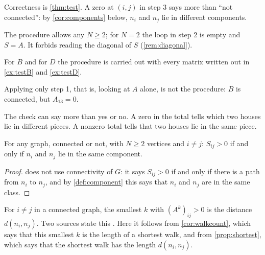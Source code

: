Correctness is \cref{thm:test}.
A zero at $(i,j)$ in step 3 says more than ``not connected'': by \cref{cor:components} below, $n_i$ and $n_j$ lie in different components.

\begin{remark}
The procedure allows any $N\ge 2$; for $N=2$ the loop in step 2 is empty and $S=A$.
It forbids reading the diagonal of $S$ (\cref{rem:diagonal}).
\end{remark}

\begin{example}
For $B$ and for $D$ the procedure is carried out with every matrix written out in \cref{ex:testB} and \cref{ex:testD}.
\end{example}

\begin{nonexample}
Applying only step 1, that is, looking at $A$ alone, is not the procedure: $B$ is connected, but $A_{13}=0$.
\end{nonexample}

\plainwords The check can say more than yes or no.
A zero in the total tells which two houses lie in different pieces.
A nonzero total tells that two houses lie in the same piece.

\begin{corollary}\label{cor:components}
For any graph, connected or not, with $N\ge 2$ vertices and $i\ne j$: $S_{ij}>0$ if and only if $n_i$ and $n_j$ lie in the same component.
\end{corollary}

\begin{proof}
 does not use connectivity of $G$: it says $S_{ij}>0$ if and only if there is a path from $n_i$ to $n_j$, and by \cref{def:component} this says that $n_i$ and $n_j$ are in the same class.
\end{proof}

\begin{remark}\label{rem:distancepowers}
For $i\ne j$ in a connected graph, the smallest $k$ with $(A^k)_{ij}>0$ is the distance $d(n_i,n_j)$.
Two sources state this \cite{lehman_mcs_adjacency,paramadevan2021adjacency}.
Here it follows from \cref{cor:walkcount}, which says that this smallest $k$ is the length of a shortest walk, and from \cref{prop:shortest}, which says that the shortest walk has the length $d(n_i,n_j)$.
\end{remark}

